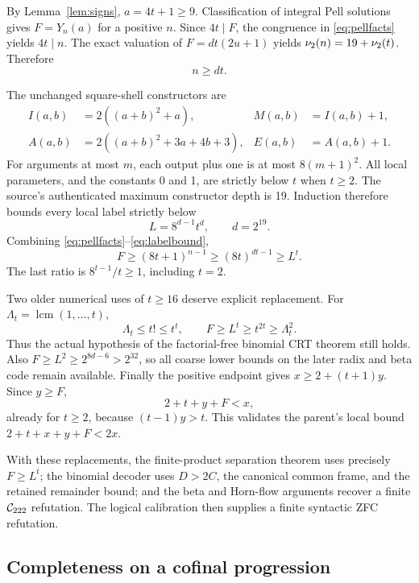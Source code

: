 By Lemma~\ref{lem:signs}, \(a=4t+1\ge9\). Classification of integral
Pell solutions gives \(F=Y_n(a)\) for a positive \(n\). Since
\(4t\mid F\), the congruence in \eqref{eq:pellfacts} yields \(4t\mid n\).
The exact valuation of \(F=dt(2u+1)\) yields
\(\nu_2(n)=19+\nu_2(t)\). Therefore
\begin{equation}\label{eq:indexbound}
 n\ge dt.
\end{equation}

The unchanged square-shell constructors are
\[
 \begin{aligned}
 I(a,b)&=2((a+b)^2+a),& M(a,b)&=I(a,b)+1,\\
 A(a,b)&=2((a+b)^2+3a+4b+3),&E(a,b)&=A(a,b)+1.
 \end{aligned}
\]
For arguments at most \(m\), each output plus one is at most
\(8(m+1)^2\). All local parameters, and the constants 0 and 1, are
strictly below \(t\) when \(t\ge2\). The source's authenticated maximum
constructor depth is 19. Induction therefore bounds every local label
strictly below
\begin{equation}\label{eq:labelbound}
 L=8^{d-1}t^d,\qquad d=2^{19}.
\end{equation}
Combining \eqref{eq:pellfacts}--\eqref{eq:labelbound},
\begin{equation}\label{eq:sharpbound}
 F\ge(8t+1)^{n-1}\ge(8t)^{dt-1}\ge L^t.
\end{equation}
The last ratio is \(8^{t-1}/t\ge1\), including \(t=2\).

Two older numerical uses of \(t\ge16\) deserve explicit replacement.
For \(\Lambda_t=\operatorname{lcm}(1,\ldots,t)\),
\[
 \Lambda_t\le t!\le t^t,\qquad
 F\ge L^t\ge t^{2t}\ge\Lambda_t^2.
\]
Thus the actual hypothesis of the factorial-free binomial CRT theorem
still holds. Also
\(F\ge L^2\ge2^{8d-6}>2^{32}\), so all coarse lower bounds on the
later radix and beta code remain available. Finally the positive endpoint
gives \(x\ge2+(t+1)y\). Since \(y\ge F\),
\[
 2+t+y+F<x,
\]
already for \(t\ge2\), because \((t-1)y>t\). This validates the
parent's local bound \(2+t+x+y+F<2x\).

With these replacements, the finite-product separation theorem uses
precisely \(F\ge L^t\); the binomial decoder uses \(D>2C\), the
canonical common frame, and the retained remainder bound; and the beta
and Horn-flow arguments recover a finite \(\mathcal C_{222}\) refutation. The
logical calibration then supplies a finite syntactic ZFC refutation.

\subsection{Completeness on a cofinal progression}


